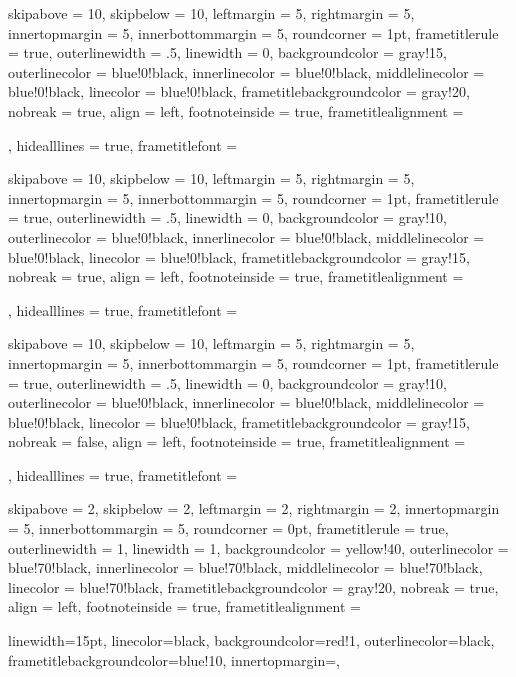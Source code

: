 {
skipabove         = 10,
skipbelow         = 10,
leftmargin        = 5,
rightmargin       = 5,
innertopmargin    = 5,
innerbottommargin = 5,
%
roundcorner =  1pt,
frametitlerule = true,
%
outerlinewidth  =  .5,
linewidth = 0,
%
backgroundcolor = gray!15,
outerlinecolor  = blue!0!black,
innerlinecolor  = blue!0!black,
middlelinecolor = blue!0!black,
linecolor       = blue!0!black,
frametitlebackgroundcolor = gray!20,
%
nobreak = true,
align = left,
footnoteinside = true,
frametitlealignment = \raggedright,
hidealllines = true,
frametitlefont = \normalfont
}


{
skipabove         = 10,
skipbelow         = 10,
leftmargin        = 5,
rightmargin       = 5,
innertopmargin    = 5,
innerbottommargin = 5,
%
roundcorner =  1pt,
frametitlerule = true,
%
outerlinewidth  =  .5,
linewidth = 0,
%
backgroundcolor = gray!10,
outerlinecolor  = blue!0!black,
innerlinecolor  = blue!0!black,
middlelinecolor = blue!0!black,
linecolor       = blue!0!black,
frametitlebackgroundcolor = gray!15,
%
nobreak = true,
align = left,
footnoteinside = true,
frametitlealignment = \raggedright,
hidealllines = true,
frametitlefont = \normalfont
}

{
skipabove         = 10,
skipbelow         = 10,
leftmargin        = 5,
rightmargin       = 5,
innertopmargin    = 5,
innerbottommargin = 5,
%
roundcorner =  1pt,
frametitlerule = true,
%
outerlinewidth  =  .5,
linewidth = 0,
%
backgroundcolor = gray!10,
outerlinecolor  = blue!0!black,
innerlinecolor  = blue!0!black,
middlelinecolor = blue!0!black,
linecolor       = blue!0!black,
frametitlebackgroundcolor = gray!15,
%
nobreak = false,
align = left,
footnoteinside = true,
frametitlealignment = \raggedright,
hidealllines = true,
frametitlefont = \normalfont
}


{
skipabove         = 2,
skipbelow         = 2,
leftmargin        = 2,
rightmargin       = 2,
innertopmargin    = 5,
innerbottommargin = 5,
%
roundcorner =  0pt,
frametitlerule = true,
%
outerlinewidth  =  1,
linewidth = 1,
%
backgroundcolor = yellow!40,
outerlinecolor  = blue!70!black,
innerlinecolor  = blue!70!black,
middlelinecolor = blue!70!black,
linecolor       = blue!70!black,
frametitlebackgroundcolor = gray!20,
%
nobreak = true,
align = left,
footnoteinside = true,
frametitlealignment = \centering
}


{linewidth=15pt,
linecolor=black,
backgroundcolor=red!1,
outerlinecolor=black,
frametitlebackgroundcolor=blue!10,
innertopmargin=\topskip,}


